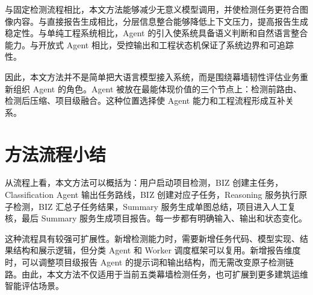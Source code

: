与固定检测流程相比，本文方法能够减少无意义模型调用，并使检测任务更符合图像内容。与直接报告生成相比，分层信息整合能够降低上下文压力，提高报告生成稳定性。与单纯工程系统相比，Agent 的引入使系统具备语义判断和自然语言整合能力。与开放式 Agent 相比，受控输出和工程状态机保证了系统边界和可追踪性。

因此，本文方法并不是简单把大语言模型接入系统，而是围绕幕墙韧性评估业务重新组织 Agent 的角色。Agent 被放在最能体现价值的三个节点上：检测前路由、检测后压缩、项目级融合。这种位置选择使 Agent 能力和工程流程形成互补关系。

\section{方法流程小结}
\label{sec:method-flow-summary}

从流程上看，本文方法可以概括为：用户启动项目检测，BIZ 创建主任务，Classification Agent 输出任务路线，BIZ 创建对应子任务，Reasoning 服务执行原子检测，BIZ 汇总子任务结果，Summary 服务生成单图总结，项目进入人工复核，最后 Summary 服务生成项目报告。每一步都有明确输入、输出和状态变化。

这种流程具有较强可扩展性。新增检测能力时，需要新增任务代码、模型实现、结果结构和展示逻辑，但分类 Agent 和 Worker 调度框架可以复用。新增报告维度时，可以调整项目级报告 Agent 的提示词和输出结构，而无需改变原子检测链路。由此，本文方法不仅适用于当前五类幕墙检测任务，也可扩展到更多建筑运维智能评估场景。
